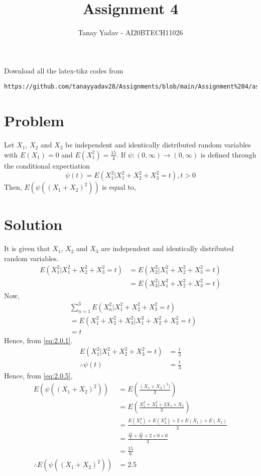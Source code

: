 \documentclass[journal,12pt,twocolumn]{IEEEtran}
\begin{document}
     \def\rightbox#1{\makebox[0in][r]{#1}}
     \def\centbox#1{\makebox[0in]{#1}}
     \def\topbox#1{\raisebox{-\baselineskip}[0in][0in]{#1}}
     \def\midbox#1{\raisebox{-0.5\baselineskip}[0in][0in]{#1}}
\vspace{3cm}
\title{Assignment 4}
\author{Tanay Yadav - AI20BTECH11026}
\maketitle
\newpage
\bigskip
\renewcommand{\thefigure}{\theenumi}
\renewcommand{\thetable}{\theenumi}
Download all the latex-tikz codes from 
%
\begin{lstlisting}
https://github.com/tanayyadav28/Assignments/blob/main/Assignment%204/assignment4.tex
\end{lstlisting}
\section{Problem}
Let $X_1$, $X_2$ and $X_3$ be independent and identically distributed random variables with $E(X_1) = 0$ and $E\left(X^2_1\right)=\frac{15}{4}$. If $\psi : (0,\infty) \rightarrow (0,\infty)$ is defined through the conditional expectiation
$$\psi(t) = E\left(X^2_1 | X_1^2 + X_2^2 + X_3^2 = t\right), t>0$$
Then, $E(\psi((X_1+X_2)^2))$ is equal to,
\section{Solution}
It is given that $X_1$, $X_2$ and $X_3$ are independent and identically distributed random variables.
\begin{align}
    \nonumber E\left(X^2_1 | X_1^2 + X_2^2 + X_3^2 = t\right) &= 
    E\left(X^2_2 | X_1^2 + X_2^2 + X_3^2 = t\right)\\ &= 
    E\left(X^2_3 | X_1^2 + X_2^2 + X_3^2 = t\right)\label{eq:2.0.1}
\end{align}
Now,
\begin{align}
   \nonumber &\sum_{n=1}^3 E\left(X^2_n | X_1^2 + X_2^2 + X_3^2 = t\right)\\ &= E\left(X_1^2 + X_2^2 + X_3^2 | X_1^2 + X_2^2 + X_3^2 = t\right)\\
   &= t
\end{align}
Hence, from \eqref{eq:2.0.1}.
\begin{align}
     E\left(X^2_1 | X_1^2 + X_2^2 + X_3^2 = t\right) &= \frac{t}{3}\\
     \therefore \psi(t) &= \frac{t}{3}\label{eq:2.0.5}
\end{align}
Hence, from \eqref{eq:2.0.5},
\begin{align}
    E(\psi((X_1+X_2)^2)) &= E\left(\frac{(X_1+X_2)^2)}{3}\right)\\
    &= E\left(\frac{X_1^2 + X_2^2 + 2X_1\times X_2}{3}\right)\\
    &= \frac{E(X_1^2) + E(X_2^2) + 2\times E(X_1) \times E(X_2)}{3}\\
    &= \frac{\frac{15}{4}+\frac{15}{4}+ 2\times0\times0}{3}\\
    &= \frac{15}{6}\\
    \therefore E(\psi((X_1+X_2)^2)) &= 2.5
\end{align}
\end{document}
